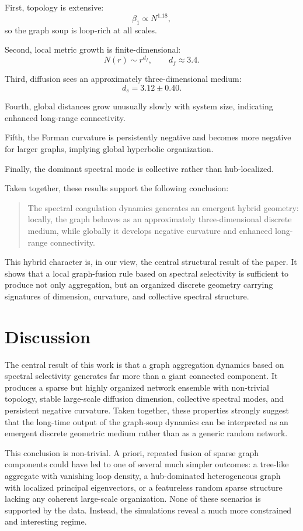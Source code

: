 \documentclass[11pt]{article}
\begin{document}
First, topology is extensive:
\[
\beta_1 \propto N^{1.18},
\]
so the graph soup is loop-rich at all scales.

Second, local metric growth is finite-dimensional:
\[
N(r)\sim r^{d_f},
\qquad
d_f \approx 3.4.
\]

Third, diffusion sees an approximately three-dimensional medium:
\[
d_s = 3.12 \pm 0.40.
\]

Fourth, global distances grow unusually slowly with system size, indicating enhanced long-range connectivity.

Fifth, the Forman curvature is persistently negative and becomes more negative for larger graphs, implying global hyperbolic organization.

Finally, the dominant spectral mode is collective rather than hub-localized.

Taken together, these results support the following conclusion:

\begin{quote}
The spectral coagulation dynamics generates an emergent hybrid geometry:
locally, the graph behaves as an approximately three-dimensional discrete medium, while globally it develops negative curvature and enhanced long-range connectivity.
\end{quote}

This hybrid character is, in our view, the central structural result of the paper.
It shows that a local graph-fusion rule based on spectral selectivity is sufficient to produce not only aggregation, but an organized discrete geometry carrying signatures of dimension, curvature, and collective spectral structure.

\section{Discussion}
\label{sec:discussion}

The central result of this work is that a graph aggregation dynamics based on spectral selectivity generates far more than a giant connected component.
It produces a sparse but highly organized network ensemble with non-trivial topology, stable large-scale diffusion dimension, collective spectral modes, and persistent negative curvature.
Taken together, these properties strongly suggest that the long-time output of the graph-soup dynamics can be interpreted as an emergent discrete geometric medium rather than as a generic random network.

This conclusion is non-trivial.
A priori, repeated fusion of sparse graph components could have led to one of several much simpler outcomes: a tree-like aggregate with vanishing loop density, a hub-dominated heterogeneous graph with localized principal eigenvectors, or a featureless random sparse structure lacking any coherent large-scale organization.
None of these scenarios is supported by the data.
Instead, the simulations reveal a much more constrained and interesting regime.
\end{document}
